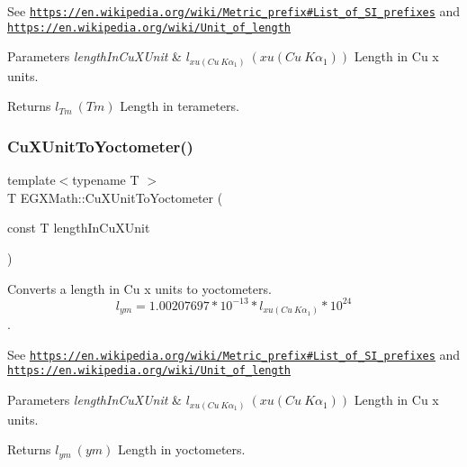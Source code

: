 See \href{https://en.wikipedia.org/wiki/Metric_prefix#List_of_SI_prefixes}{\tt https\+://en.\+wikipedia.\+org/wiki/\+Metric\+\_\+prefix\#\+List\+\_\+of\+\_\+\+S\+I\+\_\+prefixes} and \href{https://en.wikipedia.org/wiki/Unit_of_length}{\tt https\+://en.\+wikipedia.\+org/wiki/\+Unit\+\_\+of\+\_\+length} 
\begin{DoxyParams}{Parameters}
{\em length\+In\+Cu\+X\+Unit} & $ l_{xu(Cu\ K\alpha_1)}\ (xu(Cu\ K\alpha_1))$ Length in Cu x units. \\
\hline
\end{DoxyParams}
\begin{DoxyReturn}{Returns}
$ l_{Tm}\ (Tm)$ Length in terameters. 
\end{DoxyReturn}
\mbox{\label{group___e_g_x_math-_conversions-_length_conversions-_non-_s_i-_cu_x_unit-_s_i_ga1ca2e50ece8bd507137c3ce1bec24570}} 
\subsubsection{\texorpdfstring{Cu\+X\+Unit\+To\+Yoctometer()}{CuXUnitToYoctometer()}}
{\footnotesize\ttfamily template$<$typename T $>$ \\
T E\+G\+X\+Math\+::\+Cu\+X\+Unit\+To\+Yoctometer (\begin{DoxyParamCaption}\item[{const T}]{length\+In\+Cu\+X\+Unit }\end{DoxyParamCaption})}



Converts a length in Cu x units to yoctometers. \[ l_{ym}=1.00207697*10^{-13} * l_{xu(Cu\ K\alpha_1)} * 10^{24} \]. 

See \href{https://en.wikipedia.org/wiki/Metric_prefix#List_of_SI_prefixes}{\tt https\+://en.\+wikipedia.\+org/wiki/\+Metric\+\_\+prefix\#\+List\+\_\+of\+\_\+\+S\+I\+\_\+prefixes} and \href{https://en.wikipedia.org/wiki/Unit_of_length}{\tt https\+://en.\+wikipedia.\+org/wiki/\+Unit\+\_\+of\+\_\+length} 
\begin{DoxyParams}{Parameters}
{\em length\+In\+Cu\+X\+Unit} & $ l_{xu(Cu\ K\alpha_1)}\ (xu(Cu\ K\alpha_1))$ Length in Cu x units. \\
\hline
\end{DoxyParams}
\begin{DoxyReturn}{Returns}
$ l_{ym}\ (ym)$ Length in yoctometers. 
\end{DoxyReturn}
\mbox{\label{group___e_g_x_math-_conversions-_length_conversions-_non-_s_i-_cu_x_unit-_s_i_ga0bd6ee075a560568ab46fd396a6e0b19}} 
